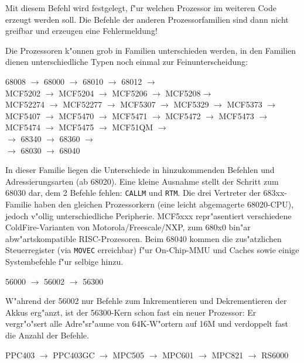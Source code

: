 \documentclass[12pt,a4paper,twoside]{report}
\newcommand{\tty}[1]{{\tt #1}}
\begin{document}
Mit diesem Befehl wird festgelegt, f"ur welchen Prozessor im weiteren
Code erzeugt werden soll.  Die Befehle der anderen Prozessorfamilien
sind dann nicht greifbar und erzeugen eine Fehlermeldung!
\par
Die Prozessoren k"onnen grob in Familien unterschieden werden, in den
Familien dienen unterschiedliche Typen noch einmal zur Feinunterscheidung:
\begin{cpulist}
   68008 $\rightarrow$ 68000 $\rightarrow$ 68010 $\rightarrow$ 68012 $\rightarrow$ \\
\> MCF5202 $\rightarrow$ MCF5204 $\rightarrow$ MCF5206 $\rightarrow$ MCF5208$\rightarrow$ \\
\> MCF52274 $\rightarrow$ MCF52277 $\rightarrow$ MCF5307 $\rightarrow$ MCF5329 $\rightarrow$ MCF5373 $\rightarrow$ \\
\> MCF5407 $\rightarrow$ MCF5470 $\rightarrow$ MCF5471 $\rightarrow$ MCF5472 $\rightarrow$ MCF5473 $\rightarrow$ \\
\> MCF5474 $\rightarrow$ MCF5475 $\rightarrow$ MCF51QM $\rightarrow$ \\
 $\rightarrow$ 68340 $\rightarrow$ 68360 $\rightarrow$ \\
 $\rightarrow$ 68030 $\rightarrow$ 68040
\end{cpulist}
In dieser Familie liegen die Unterschiede in hinzukommenden Befehlen
und Adressierungsarten (ab 68020).  Eine kleine Ausnahme stellt der
Schritt zum 68030 dar, dem 2 Befehle fehlen: \tty{CALLM} und \tty{RTM}.
Die drei Vertreter der 683xx-Familie haben den gleichen Prozessorkern (eine
leicht abgemagerte 68020-CPU), jedoch v"ollig unterschiedliche Peripherie.
MCF5xxx repr"asentiert verschiedene ColdFire-Varianten von Motorola/Freescale/NXP,
zum 680x0 bin"ar abw"artskompatible RISC-Prozesoren. Beim 68040 kommen die zus"atzlichen
Steuerregister (via \tty{MOVEC} erreichbar) f"ur On-Chip-MMU und Caches
sowie einige Systembefehle f"ur selbige hinzu.
\begin{cpulist}
   56000 $\longrightarrow$ 56002 $\longrightarrow$ 56300
\end{cpulist}
W"ahrend der 56002 nur Befehle zum Inkrementieren und Dekrementieren der
Akkus erg"anzt, ist der 56300-Kern schon fast ein neuer Prozessor: Er
vergr"o"sert alle Adre"sr"aume von 64K-W"ortern auf 16M und verdoppelt fast
die Anzahl der Befehle.
\begin{cpulist}
   PPC403 $\rightarrow$ PPC403GC $\rightarrow$ MPC505 $\rightarrow$ MPC601 $\rightarrow$ MPC821 $\rightarrow$ RS6000
\end{cpulist}
\end{document}
